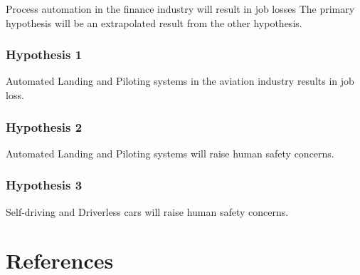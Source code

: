 \documentclass[
  english,
  man]{apa7}
\begin{document}
Process automation in the finance industry will result in job losses
The primary hypothesis will be an extrapolated result from the other hypothesis.

\hypertarget{hypothesis-1}{%
\subsubsection{Hypothesis 1}\label{hypothesis-1}}

Automated Landing and Piloting systems in the aviation industry results in job loss.

\hypertarget{hypothesis-2}{%
\subsubsection{Hypothesis 2}\label{hypothesis-2}}

Automated Landing and Piloting systems will raise human safety concerns.

\hypertarget{hypothesis-3}{%
\subsubsection{Hypothesis 3}\label{hypothesis-3}}

Self-driving and Driverless cars will raise human safety concerns.

\newpage

\hypertarget{references}{%
\section{References}\label{references}}

\begingroup
\setlength{\parindent}{-0.5in}
\setlength{\leftskip}{0.5in}
\end{document}
